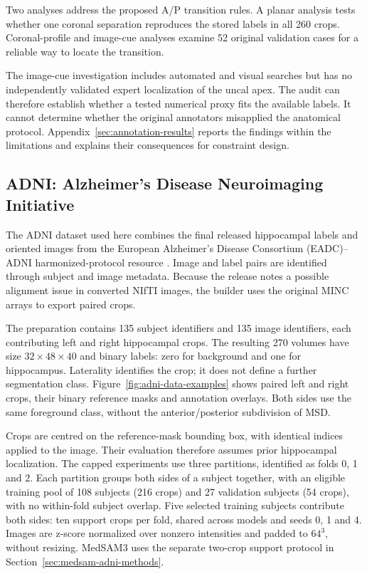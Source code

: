 \documentclass[12pt,a4paper]{article}
\begin{document}
Two analyses address the proposed A/P transition rules. A planar analysis tests
whether one coronal separation reproduces the stored labels in all
260 crops. Coronal-profile and image-cue analyses examine 52 original
validation cases for a reliable way to locate the transition.

The image-cue investigation includes automated and visual searches but
has no independently validated expert localization of the uncal apex.
The audit can therefore establish whether a tested numerical proxy fits
the available labels. It cannot determine whether the original annotators
misapplied the anatomical protocol. Appendix~\ref{sec:annotation-results}
reports the findings within the limitations and explains their
consequences for constraint design.


\subsection{ADNI: Alzheimer's Disease Neuroimaging Initiative}
\label{sec:adni-methods}


The ADNI dataset used here combines the final released hippocampal labels
and oriented images from the European Alzheimer's Disease Consortium
(EADC)--ADNI harmonized-protocol resource
\cite{harpReleasedLabels}. Image and label pairs are identified through
subject and image metadata. Because the release notes a possible
alignment issue in converted NIfTI images, the builder uses the
original MINC arrays to export paired crops.

The preparation contains 135 subject identifiers and 135 image
identifiers, each contributing left and right hippocampal crops.
The resulting 270 volumes have size $32\times48\times40$ and binary
labels: zero for background and one for hippocampus. Laterality
identifies the crop; it does not define a further segmentation class.
Figure~\ref{fig:adni-data-examples} shows paired left and right crops,
their binary reference masks and annotation overlays. Both sides use
the same foreground class, without the anterior/posterior subdivision
of MSD.


Crops are centred on the reference-mask bounding box, with identical
indices applied to the image. Their evaluation therefore assumes prior
hippocampal localization. The capped experiments use three partitions,
identified as folds 0, 1 and 2. Each partition groups both sides of a
subject together, with an eligible training pool of 108 subjects
(216 crops) and 27 validation subjects (54 crops), with no within-fold
subject overlap. Five selected training subjects contribute both sides:
ten support crops per fold, shared across models and seeds 0, 1 and 4.
Images are
z-score normalized over nonzero intensities and padded to $64^3$,
without resizing. MedSAM3 uses the separate
two-crop support protocol in Section~\ref{sec:medsam-adni-methods}.
\end{document}
